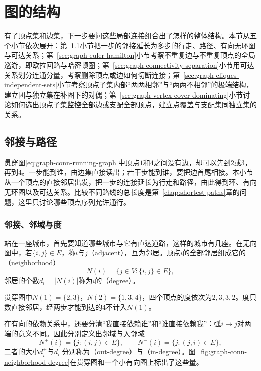 \section{图的结构}
\label{sec:graph-structures}

有了顶点集和边集，下一步要问这些局部连接组合出了怎样的整体结构。本节从五个小节依次展开：第~\ref{sec:graph-adjacency-paths}小节把一步的邻接延长为多步的行走、路径、有向无环图与可达关系；第~\ref{sec:graph-euler-hamilton}小节考察不重复边与不重复顶点的全局巡游，即欧拉回路与哈密顿圈；第~\ref{sec:graph-connectivity-separation}小节用可达关系划分连通分量，考察删除顶点或边如何切断连接；第~\ref{sec:graph-cliques-independent-sets}小节考察顶点子集内部“两两相邻”与“两两不相邻”的极端结构，建立团与独立集在补图下的对偶；第~\ref{sec:graph-vertex-cover-dominating}小节讨论如何选出顶点子集监控全部边或支配全部顶点，建立点覆盖与支配集同独立集的关系。

\subsection{邻接与路径}
\label{sec:graph-adjacency-paths}

贯穿图\eqref{eq:graph-conn-running-graph}中顶点$1$和$4$之间没有边，却可以先到$2$或$3$，再到$4$。一步能到谁，由边集直接读出；若干步能到谁，要把边首尾相接。本小节从一个顶点的直接邻居出发，把一步的连接延长为行走和路径，由此得到环、有向无环图以及可达关系。比较不同路线的总长度是第~\ref{chap:shortest-paths}章的问题，这里只讨论哪些顶点序列允许通行。

\subsubsection{邻接、邻域与度}
\label{sec:graph-conn-neighborhoods}

站在一座城市，首先要知道哪些城市与它有直达道路，这样的城市有几座。在无向图中，若$\{i,j\}\in E$，称$i$与$j$（adjacent），互为邻居。顶点$i$的全部邻居组成它的（neighborhood）
\[
N(i)=\{j\in V:\{i,j\}\in E\},
\]
邻居的个数$d_i=|N(i)|$称为$i$的（degree）。

贯穿图中$N(1)=\{2,3\}$，$N(2)=\{1,3,4\}$，四个顶点的度依次为$2,3,3,2$。度只数直接邻居，经两步才能到达的$4$不计入$N(1)$。

在有向的依赖关系中，还要分清“我直接依赖谁”和“谁直接依赖我”：弧$i\to j$对两端的意义不同。因此分别定义出邻域与入邻域
\[
N^+(i)=\{j:(i,j)\in E\},\qquad
N^-(i)=\{j:(j,i)\in E\},
\]
二者的大小$d_i^+$与$d_i^-$分别称为（out-degree）与（in-degree）。图~\ref{fig:graph-conn-neighborhood-degree}在贯穿图和一个小有向图上标出了这些量。

